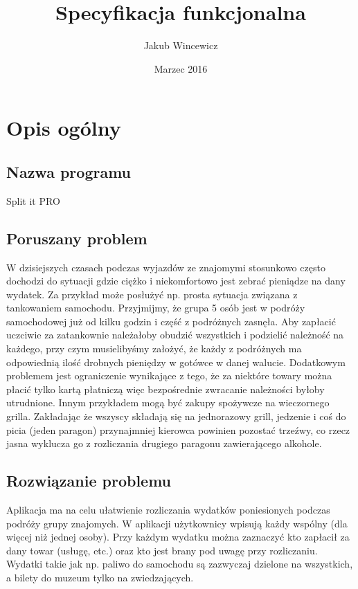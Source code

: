 \documentclass[12pt, letterpaper, ]{article}
\title{Specyfikacja funkcjonalna}
\author{Jakub Wincewicz}
\date{Marzec 2016}
\begin{document}
	
	\begin{titlepage}
		\maketitle
	\end{titlepage}
	
	\tableofcontents
	\newpage
	
	\section[Opis ogólny]{Opis ogólny}
	\subsection{Nazwa programu}
		Split it PRO
	\subsection{Poruszany problem}
		W dzisiejszych czasach podczas wyjazdów ze znajomymi stosunkowo często dochodzi do sytuacji gdzie ciężko i niekomfortowo jest zebrać pieniądze na dany wydatek. Za przykład może posłużyć np. prosta sytuacja związana z tankowaniem samochodu. Przyjmijmy, że grupa 5 osób jest w podróży samochodowej już od kilku godzin i część z podróżnych zasnęła. Aby zapłacić uczciwie za zatankownie należałoby obudzić wszystkich i podzielić należność na każdego, przy czym musielibyśmy założyć, że każdy z podróżnych ma odpowiednią ilość drobnych pieniędzy w gotówce w danej walucie.
	\newline
		Dodatkowym problemem jest ograniczenie wynikające z tego, że za niektóre towary można płacić tylko kartą płatniczą więc bezpośrednie zwracanie należności byłoby utrudnione. Innym przykładem mogą być zakupy spożywcze na wieczornego grilla. Zakładając że wszyscy składają się na jednorazowy grill, jedzenie i coś do picia (jeden paragon) przynajmniej kierowca powinien pozostać trzeźwy, co rzecz jasna wyklucza go z rozliczania drugiego paragonu zawierającego alkohole. 
	\subsection{Rozwiązanie problemu}
		Aplikacja ma na celu ułatwienie rozliczania wydatków poniesionych podczas podróży grupy znajomych. W aplikacji użytkownicy wpisują każdy wspólny (dla więcej niż jednej osoby). Przy każdym wydatku można zaznaczyć kto zapłacił za dany towar (usługę, etc.) oraz kto jest brany pod uwagę przy rozliczaniu. Wydatki takie jak np. paliwo do samochodu są zazwyczaj dzielone na wszystkich, a bilety do muzeum tylko na zwiedzających. 	
\end{document}
